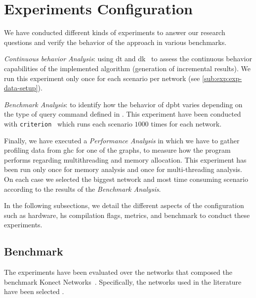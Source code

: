 \section{Experiments Configuration}
We have conducted different kinds of experiments to answer our research questions and verify the behavior of the approach in various benchmarks.
\begin{inparaenum}[\bf i\upshape)]
  \item \emph{Continuous behavior Analysis}: using \acrshort{dt} and \acrshort{dk}~\cite{diefpaper} to assess the continuous behavior capabilities of the implemented algorithm (generation of incremental results). We run this experiment only once for each scenario per network (see \autoref{sub:exp:exp-data-setup}).
  \item \emph{Benchmark Analysis}: to identify how the behavior of \acrshort{dpbt} varies depending on the type of query command defined in . This experiment have been conducted with \texttt{criterion}~\cite{criterion} which runs each scenario $1000$ times for each network.
  \item Finally, we have executed a \textit{Performance Analysis} in which we have to gather profiling data from \acrfull{ghc} for one of the graphs, to measure how the program performs regarding multithreading and memory allocation. This experiment has been run only once for memory analysis and once for multi-threading analysis. On each case we selected the biggest network and most time consuming scenario according to the results of the \emph{Benchmark Analysis}. 
\end{inparaenum}
In the following subsections, we detail the different aspects of the configuration such as hardware, \acrshort{hs} compilation flags, metrics, and benchmark to conduct these experiments.


\subsection{Benchmark}\label{data:set}
The experiments have been evaluated over the networks that composed the benchmark Konect Networks~\cite{konect}. 
Specifically, the networks used in the literature have been selected \cite{konect:2017:dbpedia-recordlabel,konect:2017:moreno_crime,konect:2017:opsahl-ucforum,konect:2017:wang-amazon}.

